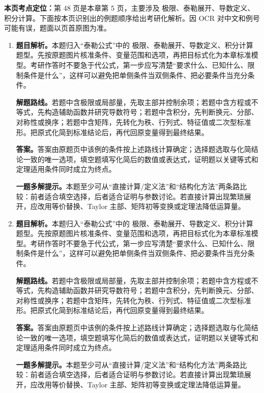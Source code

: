 \begin{solutionblock}
\textbf{本页考点定位：}第 48 页是本章第 5 页，主要涉及 极限、泰勒展开、导数定义、积分计算。下面按本页识别出的例题顺序给出考研化解析。因 OCR 对中文和例号可能有误，题面以页首原图为准。

\begin{enumerate}[label=\textbf{例\arabic*.}, leftmargin=2.4em]

\item \textbf{题目解析。}本题归入“泰勒公式”中的 极限、泰勒展开、导数定义、积分计算 题型。先按原题图片核准条件、变量范围和选项，再把目标式化为本章标准模型。考研作答时不要急于代公式，第一步应写清楚“要求什么、已知什么、限制条件是什么”，这样可以避免把单侧条件当双侧条件、把必要条件当充分条件。

\textbf{解题路线。}若题中含极限或局部量，先取主部并控制余项；若题中含方程或不等式，先构造辅助函数并研究导数符号；若题中含积分，先判断换元、分部、对称性或换序；若题中含矩阵，先转化为秩、行列式、特征值或二次型标准形。把原式化简到标准结论后，再代回原变量得到最终结果。

\textbf{答案。}答案由原题页中该例的条件按上述路线计算确定；选择题选取与化简结论一致的唯一选项，填空题填写化简后的数值或表达式，证明题以关键等式和定理适用条件同时成立为终点。

\textbf{一题多解提示。}本题至少可从“直接计算/定义法”和“结构化方法”两条路比较：前者适合填空选择，后者适合证明与参数讨论。若直接计算出现繁琐展开，应改用等价替换、Taylor 主部、矩阵初等变换或定理法降低运算量。

\item \textbf{题目解析。}本题归入“泰勒公式”中的 极限、泰勒展开、导数定义、积分计算 题型。先按原题图片核准条件、变量范围和选项，再把目标式化为本章标准模型。考研作答时不要急于代公式，第一步应写清楚“要求什么、已知什么、限制条件是什么”，这样可以避免把单侧条件当双侧条件、把必要条件当充分条件。

\textbf{解题路线。}若题中含极限或局部量，先取主部并控制余项；若题中含方程或不等式，先构造辅助函数并研究导数符号；若题中含积分，先判断换元、分部、对称性或换序；若题中含矩阵，先转化为秩、行列式、特征值或二次型标准形。把原式化简到标准结论后，再代回原变量得到最终结果。

\textbf{答案。}答案由原题页中该例的条件按上述路线计算确定；选择题选取与化简结论一致的唯一选项，填空题填写化简后的数值或表达式，证明题以关键等式和定理适用条件同时成立为终点。

\textbf{一题多解提示。}本题至少可从“直接计算/定义法”和“结构化方法”两条路比较：前者适合填空选择，后者适合证明与参数讨论。若直接计算出现繁琐展开，应改用等价替换、Taylor 主部、矩阵初等变换或定理法降低运算量。

\end{enumerate}
\end{solutionblock}



